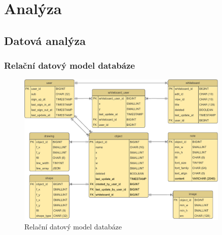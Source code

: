 

\clearpage




\section{Analýza}
\label{sec:3.2}
\subsection{Datová analýza}
\subsubsection{Relační datový model databáze}
\begin{figure}[h!]
	\centering
	\includegraphics[width=0.9\textwidth]{Figures/EntityRelationshipDiagram.pdf}
	\caption{Relační datový model databáze}
	\label{fig:EntityRelationshipDiagram}
\end{figure}




